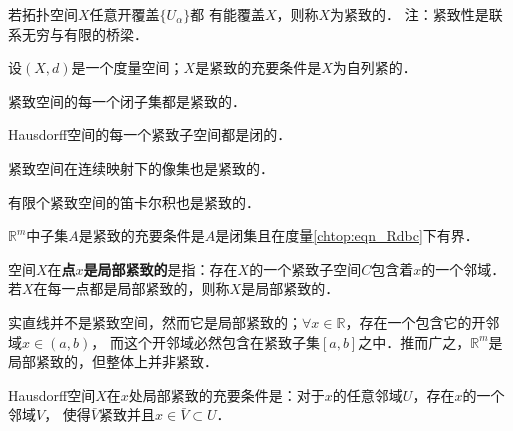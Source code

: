    


\begin{definition}\label{chtop:def_compact}
    若拓扑空间$X$任意开覆盖$\{U_\alpha\}$都
    有能覆盖$X$，则称$X$为{\heiti 紧致的}．
    注：紧致性是联系无穷与有限的桥梁．
\end{definition}



\begin{theorem}
	设$(X,d)$是一个度量空间；$X$是紧致的充要条件是$X$为自列紧的．
\end{theorem}


\begin{proposition}
    紧致空间的每一个闭子集都是紧致的．
\end{proposition}


\begin{proposition}
    Hausdorff空间的每一个紧致子空间都是闭的．
\end{proposition}


\begin{proposition}
    紧致空间在连续映射下的像集也是紧致的．
\end{proposition}

\begin{proposition}
    有限个紧致空间的笛卡尔积也是紧致的．
\end{proposition}


\begin{proposition}
    $\mathbb{R}^m$中子集$A$是紧致的充要条件是$A$是闭集且在度量\eqref{chtop:eqn_Rdbc}下有界．
\end{proposition}

\begin{definition}
    空间$X$在{\heiti\bfseries 点$x$是局部紧致的}是指：存在$X$的一个紧致子空间$C$包含着$x$的一个邻域．
    若$X$在每一点都是局部紧致的，则称$X$是{\heiti 局部紧致的}．
\end{definition}


实直线并不是紧致空间，然而它是局部紧致的；$\forall x\in \mathbb{R}$，存在一个包含它的开邻域$x\in (a,b)$，
而这个开邻域必然包含在紧致子集$[a,b]$之中．推而广之，$\mathbb{R}^m$是局部紧致的，但整体上并非紧致．

\begin{theorem}
    Hausdorff空间$X$在$x$处局部紧致的充要条件是：对于$x$的任意邻域$U$，存在$x$的一个邻域$V$，
    使得$\bar{V}$紧致并且$x\in \bar{V}\subset U$．
\end{theorem}

